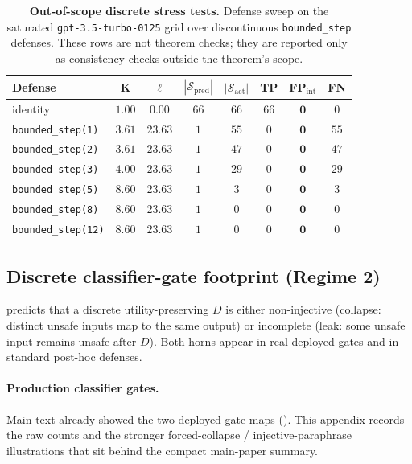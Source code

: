 \documentclass[11pt]{article}
\begin{document}
\begin{table}[h]
\centering
\small
\caption{\textbf{Out-of-scope discrete stress tests.} Defense sweep on
the saturated \texttt{gpt-3.5-turbo-0125} grid over discontinuous
\texttt{bounded\_step} defenses. These rows are not theorem checks; they
are reported only as consistency checks outside the theorem's scope.}
\label{tab:live-sweep}
\begin{tabular}{lccccccc}
\toprule
\textbf{Defense} & $\boldsymbol{K}$ & $\boldsymbol{\ell}$ & $|\mathcal{S}_{\text{pred}}|$ & $|\mathcal{S}_{\text{act}}|$ & \textbf{TP} & \textbf{FP}$_{\text{int}}$ & \textbf{FN} \\
\midrule
identity                   & $1.00$ & $0.00$  & $66$ & $66$ & $66$ & $\mathbf{0}$ & $0$ \\
\texttt{bounded\_step(1)}  & $3.61$ & $23.63$ & $1$  & $55$ & $0$  & $\mathbf{0}$ & $55$ \\
\texttt{bounded\_step(2)}  & $3.61$ & $23.63$ & $1$  & $47$ & $0$  & $\mathbf{0}$ & $47$ \\
\texttt{bounded\_step(3)}  & $4.00$ & $23.63$ & $1$  & $29$ & $0$  & $\mathbf{0}$ & $29$ \\
\texttt{bounded\_step(5)}  & $8.60$ & $23.63$ & $1$  & $3$  & $0$  & $\mathbf{0}$ & $3$  \\
\texttt{bounded\_step(8)}  & $8.60$ & $23.63$ & $1$  & $0$  & $0$  & $\mathbf{0}$ & $0$  \\
\texttt{bounded\_step(12)} & $8.60$ & $23.63$ & $1$  & $0$  & $0$  & $\mathbf{0}$ & $0$  \\
\bottomrule
\end{tabular}
\end{table}

\subsection{Discrete classifier-gate footprint (Regime 2)}
\label{sec:discrete-regime}

 predicts that a discrete utility-preserving
$D$ is either non-injective (collapse: distinct unsafe inputs map to
the same output) or incomplete (leak: some unsafe input remains
unsafe after $D$). Both horns appear in real deployed gates and in
standard post-hoc defenses.

\paragraph{Production classifier gates.}
Main text already showed the two deployed gate maps
(). This appendix records the raw
counts and the stronger forced-collapse / injective-paraphrase
illustrations that sit behind the compact main-paper summary.
\end{document}
